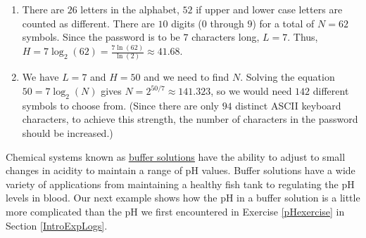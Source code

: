 {
\begin{enumerate}

\item  There are $26$ letters in the alphabet, $52$ if upper and lower case letters are counted as different.  There are $10$ digits ($0$ through $9$) for a total of $N=62$ symbols.  Since the password is to be $7$ characters long, $L = 7$.  Thus, $H = 7 \log_{2}(62) = \frac{7 \ln(62)}{\ln(2)} \approx 41.68$.

\item  We have $L = 7$ and $H=50$ and we need to find $N$.  Solving the equation $50 = 7 \log_{2}(N)$ gives $N = 2^{50/7} \approx 141.323$, so we would need $142$ different symbols to choose from. (Since there are only $94$ distinct ASCII keyboard characters, to achieve this strength, the number of characters in the password should be increased.) 

\end{enumerate}
}

\medskip

Chemical systems known as \href{http://en.wikipedia.org/wiki/Buffer_solutions}{\underline{buffer solutions}}  have the ability to adjust to small changes in acidity to maintain a range of pH values.  Buffer solutions have a wide variety of applications from maintaining a healthy fish tank to regulating the pH levels in blood.  Our next example shows how the pH in a buffer solution is a little more complicated than the pH we first encountered in Exercise \ref{pHexercise} in Section \ref{IntroExpLogs}. 

